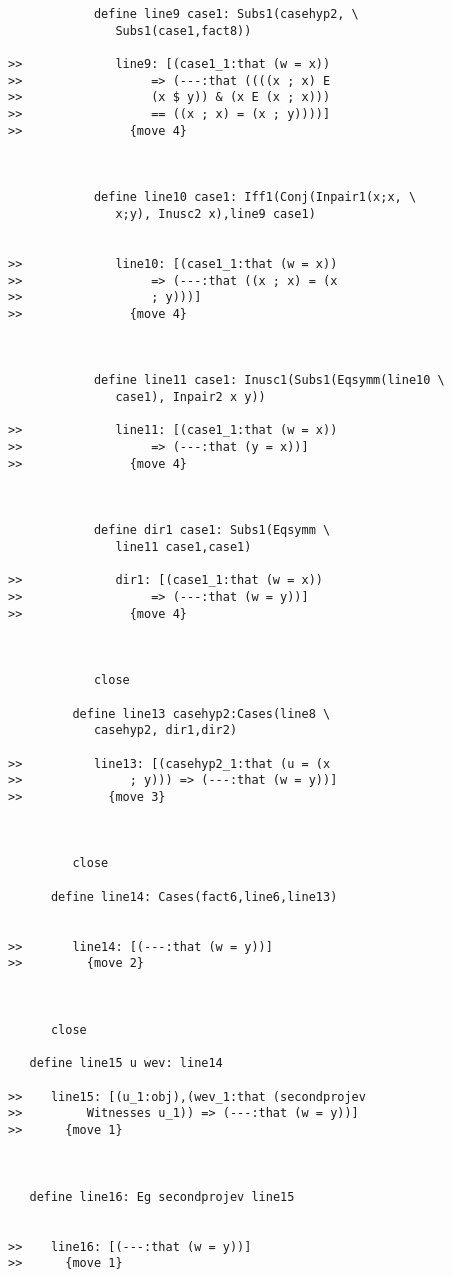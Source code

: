 \documentclass[12pt]{article}
\begin{document}
\begin{verbatim}
            define line9 case1: Subs1(casehyp2, \
               Subs1(case1,fact8))

>>             line9: [(case1_1:that (w = x))
>>                  => (---:that ((((x ; x) E
>>                  (x $ y)) & (x E (x ; x)))
>>                  == ((x ; x) = (x ; y))))]
>>               {move 4}



            define line10 case1: Iff1(Conj(Inpair1(x;x, \
               x;y), Inusc2 x),line9 case1)


>>             line10: [(case1_1:that (w = x))
>>                  => (---:that ((x ; x) = (x
>>                  ; y)))]
>>               {move 4}



            define line11 case1: Inusc1(Subs1(Eqsymm(line10 \
               case1), Inpair2 x y))

>>             line11: [(case1_1:that (w = x))
>>                  => (---:that (y = x))]
>>               {move 4}



            define dir1 case1: Subs1(Eqsymm \
               line11 case1,case1)

>>             dir1: [(case1_1:that (w = x))
>>                  => (---:that (w = y))]
>>               {move 4}



            close

         define line13 casehyp2:Cases(line8 \
            casehyp2, dir1,dir2)

>>          line13: [(casehyp2_1:that (u = (x
>>               ; y))) => (---:that (w = y))]
>>            {move 3}



         close

      define line14: Cases(fact6,line6,line13)


>>       line14: [(---:that (w = y))]
>>         {move 2}



      close

   define line15 u wev: line14

>>    line15: [(u_1:obj),(wev_1:that (secondprojev
>>         Witnesses u_1)) => (---:that (w = y))]
>>      {move 1}



   define line16: Eg secondprojev line15


>>    line16: [(---:that (w = y))]
>>      {move 1}




\end{verbatim}
\end{document}
